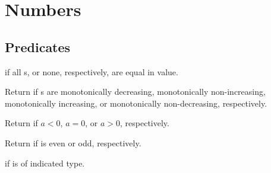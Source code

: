 %
%

\section{Numbers} 

\subsection{Predicates} 

\begin{LIST}{1cm}

     {
       \retval{\T} if all s, or
       none, respectively,  are equal in value.
     }

  {
  Return \retval{\T} if s are
  monotonically decreasing, monotonically non-increasing,
  monotonically increasing, or monotonically non-decreasing, respectively. 
  }

  {
  Return \retval{\T} if $a < 0$, $a = 0$, or $a > 0$, respectively.
  }

  {
    Return \retval{\T} if  is even or odd, respectively.
  }

  {
  \retval{\T} if  is of
  indicated type.
  }

\end{LIST}

